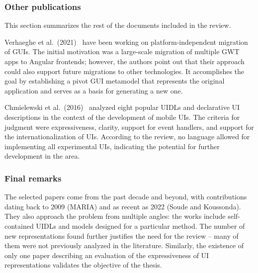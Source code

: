 \subsubsection{Other publications}

This section summarizes the rest of the documents included in the review.

Verhaeghe et al.\ (2021)~\cite{Verhaeghe2021visual, Verhaeghe2021behavior} have been working on platform-independent migration of GUIs.
The initial motivation was a large-scale migration of multiple GWT apps to Angular frontends;
however, the authors point out that their approach could also support future migrations to other technologies.
It accomplishes the goal by establishing a pivot GUI metamodel that represents the original application and serves as a basis for generating a new one.

Chmielewski et al.\ (2016)~\cite{Chmielewski2016} analyzed eight popular UIDLs and declarative UI descriptions in the context of the development of mobile UIs.
The criteria for judgment were expressiveness, clarity, support for event handlers, and support for the internationalization of UIs.
According to the review, no language allowed for implementing all experimental UIs, indicating the potential for further development in the area.

\subsubsection{Final remarks}

The selected papers come from the past decade and beyond, with contributions dating back to 2009 (MARIA) and as recent as 2022 (Soude and Koussonda).
They also approach the problem from multiple angles: the works include self-contained UIDLs and models designed for a particular method.
The number of new representations found further justifies the need for the review -- many of them were not previously analyzed in the literature.
Similarly, the existence of only one paper describing an evaluation of the expressiveness of UI representations validates the objective of the thesis.
